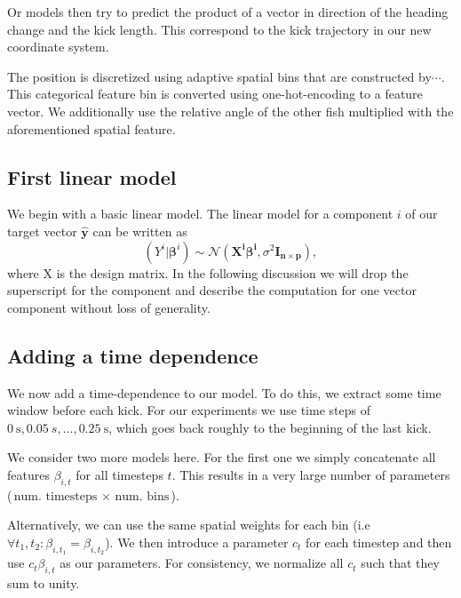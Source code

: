 \documentclass[nobib]{tufte-handout}
\begin{document}
Or models then try to predict the product of a vector in direction of the heading change and the kick length.
This correspond to the kick trajectory in our new coordinate system.

The position is discretized using adaptive spatial bins that are constructed by\(\cdots\).
This categorical feature bin is converted using one-hot-encoding to a feature vector.
We additionally use the relative angle of the other fish multiplied with the aforementioned spatial feature.

\subsection{First linear model}
We begin with a basic linear model.
The linear model for a component \(i\) of our target vector \(\hat{\bm{y}}\) can be written as
\begin{equation*}
 \left( Y^i | \bm{\beta}^{i} \right)  \sim \mathcal{N} \left( \bm{X^i} \bm{\beta^i}, \sigma^2 \bm{I_{n \times p}}  \right),
\end{equation*}
where X is the design matrix.
In the following discussion we will drop the superscript for the component and describe the computation for one vector component without loss of generality.

\subsection{Adding a time dependence}
We now add a time-dependence to our model.
To do this, we extract some time window before each kick.
For our experiments we use time steps of \(\SI{0}{\s}, \SI{0.05}{s}, \ldots, \SI{0.25}{\s}\), which goes back roughly to the beginning of the last kick.

We consider two more models here.
For the first one we simply concatenate all features \(\beta_{i, t}\) for all timesteps \(t\).
This results in a very large number of parameters (\(\text{num. timesteps } \times \text{ num. bins}\)).

Alternatively, we can use the same spatial weights for each bin (i.e\ \( \forall t_1, t_2: \beta_{i, t_1} = \beta_{i, t_2}\)).
We then introduce a parameter \(c_t\) for each timestep and then use $c_t \beta_{i,t}$ as our parameters.
For consistency, we normalize all \(c_t\) such that they sum to unity.
\end{document}
